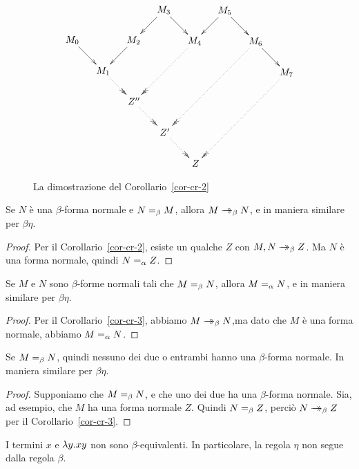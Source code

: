 \documentclass{article}
\begin{document}
\begin{figure}
\vspace{-6em}
\[ \xymatrix@dr{
  && M_5\ar@{->}[r]\ar@{->}[d]
  & M_6\ar@{->}[r]\ar@{.>>}[ddd]
  & M_7\ar@{.>>}[ddd]
  \\& M_3\ar@{->}[r]\ar@{->}[d]
  & M_4\ar@{.>>}[dd]
  \\& M_2\ar@{->}[d]
  \\ M_0\ar@{->}[r]
  & M_1\ar@{.>>}[r]
  & Z''\ar@{.>>}[r]
  & Z'\ar@{.>>}[r]
  & Z
  }
\]
\caption{La dimostrazione del Corollario~\ref{cor-cr-2}}
\label{fig-cor-cr-2}
\end{figure}

\begin{corollary}\label{cor-cr-3}
  Se $N$ \`e una $\beta$-forma normale e $N=_{\beta} M$, allora $M\mathrel{\rightarrow\!\!\!\!\!\rightarrow}_{\beta} N$, e
  in maniera similare per $\beta\eta$.
\end{corollary}

\begin{proof}
  Per il Corollario~\ref{cor-cr-2}, esiste un qualche $Z$ con $M,N\mathrel{\rightarrow\!\!\!\!\!\rightarrow}_{\beta}
  Z$. Ma $N$ \`e una forma normale, quindi $N=_{\alpha} Z$. \eot
\end{proof}

\begin{corollary}\label{cor-cr-4}
  Se $M$ e $N$ sono $\beta$-forme normali tali che $M=_{\beta} N$, allora
  $M=_{\alpha} N$, e in maniera similare per $\beta\eta$.
\end{corollary}

\begin{proof}
  Per il Corollario~\ref{cor-cr-3}, abbiamo $M\mathrel{\rightarrow\!\!\!\!\!\rightarrow}_{\beta} N$,ma dato che $M$ \`e una
  forma normale, abbiamo $M=_{\alpha} N$. \eot
\end{proof}

\begin{corollary}
  Se $M=_{\beta} N$, quindi nessuno dei due o entrambi hanno una $\beta$-forma
  normale. In maniera similare per $\beta\eta$.
\end{corollary}

\begin{proof}
  Supponiamo che $M=_{\beta} N$, e che uno dei due ha una $\beta$-forma
  normale. Sia, ad esempio, che $M$ ha una forma normale $Z$. Quindi $N=_{\beta}
  Z$, perci\`o $N\mathrel{\rightarrow\!\!\!\!\!\rightarrow}_{\beta} Z$ per il Corollario~\ref{cor-cr-3}. \eot
\end{proof}

\begin{corollary}\label{cor-beta-not-eta}
  I termini $x$ e $\lambda y.xy$ non sono $\beta$-equivalenti. In
  particolare, la regola $\eta$ non segue dalla regola $\beta$.
\end{corollary}
\end{document}
